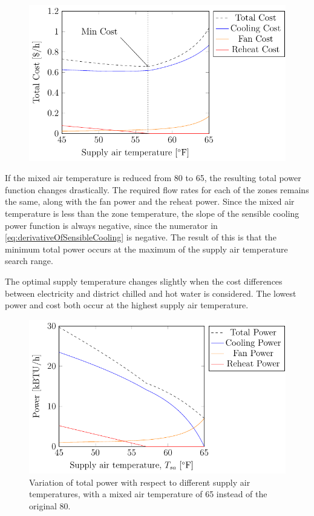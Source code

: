 \begin{figure}
\centering
\includegraphics{Plots/35-SimplifiedExampleCostHighMAT/simplifiedExampleCostHighMAT.pdf}
\caption{}
\label{fig:simplifiedExampleCost}
\end{figure}

If the mixed air temperature is reduced from \SI{80}{\degreeF} to
\SI{65}{\degreeF}, the resulting total power function changes
drastically. The required flow rates for each of the zones remains the
same, along with the fan power and the reheat power. Since the mixed air
temperature is less than the zone temperature, the slope of the sensible
cooling power function is always negative, since the numerator in
 \ref{eq:derivativeOfSensibleCooling} is negative. The
result of this is that the minimum total power occurs at the maximum of
the supply air temperature search range.   

The optimal supply temperature changes slightly when the cost
differences between electricity and district chilled and hot water is
considered. The lowest power and cost both occur at the highest supply air
temperature. 

\newcommand{\variationCaptionLowMAT}[1]{Variation of total #1 with respect to different supply air
temperatures, with a mixed air temperature of \SI{65}{\degreeF} instead
of the original \SI{80}{\degreeF}.}

\begin{figure}
\centering
\includegraphics{Plots/34-SimplifiedExampleLowerMAT/simplifiedExampleLowerMAT.pdf}
\caption{\variationCaptionLowMAT{power}}
\label{fig:simplifiedExamplePowerLowerMAT}
\end{figure}

